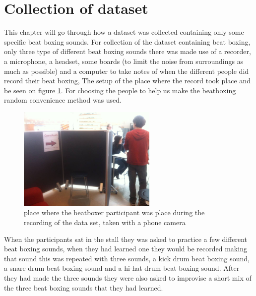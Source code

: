 \section{Collection of dataset}
This chapter will go through how a dataset was collected containing only some specific beat boxing sounds.
For collection of the dataset containing beat boxing, only three type of different beat boxing sounds there was made use of a recorder, a microphone, a headset, some boards (to limit the noise from surroundings as much as possible) and a computer to take notes of when the different people did record their beat boxing, The setup of the place where the record took place and be seen on figure \ref{data-collection-pic}. For choosing the people to help us make the beatboxing random convenience method was used. 
\begin{figure}[h]
	\begin{center}
		\includegraphics[height=5cm]{fig/dataset_collection.JPG}
		\caption{ place where the beatboxer participant was place during the recording of the data set, taken with a phone camera}
		\label{data-collection-pic}
	\end{center}
\end{figure}
When the participants sat in the stall they was asked to practice a few different beat boxing sounds, when they had learned one they would be recorded making that  sound this was repeated with three sounds, a kick drum beat boxing sound, a snare drum beat boxing sound and a hi-hat drum beat boxing sound. After they had made the three sounds they were also asked to improvise a short mix of the three beat boxing sounds that they had learned.
